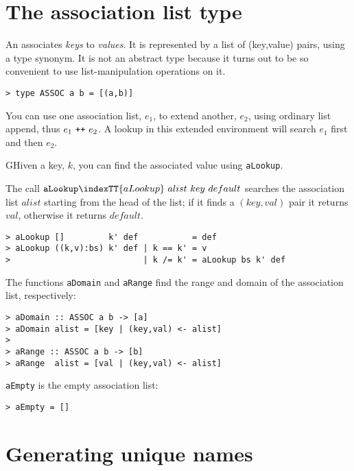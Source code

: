\section{The association list type}
\label{sect:assoc}

An  associates {\em keys\/} to {\em values}.
It is represented by a list of (key,value) pairs, using a type synonym.
It is not an abstract type
because it turns out to be so convenient to use list-manipulation
operations on it.
\begin{verbatim}
> type ASSOC a b = [(a,b)]
\end{verbatim}
%
You can use one association list, $e_1$, to extend another, $e_2$,
using ordinary list append, thus $e_1\ \mbox{\tt ++}\ e_2$.
A lookup in this extended environment
will search $e_1$ first and then $e_2$.

GHiven a key, $k$, you can find the associated value using \mbox{\tt aLookup}.


The call $\mbox{\tt aLookup}\indexTT{aLookup}~alist~key~default$ searches the association list
$alist$ starting from the head of the list;
if it finds a $(key,val)$ pair it returns $val$,
otherwise it returns $default$.
\begin{verbatim}
> aLookup []         k' def           = def
> aLookup ((k,v):bs) k' def | k == k' = v
>                           | k /= k' = aLookup bs k' def
\end{verbatim}
%
%
\par
The functions \mbox{\tt aDomain} and \mbox{\tt aRange} find the range and domain of the
association list, respectively:
\begin{verbatim}
> aDomain :: ASSOC a b -> [a]
> aDomain alist = [key | (key,val) <- alist]
>
> aRange :: ASSOC a b -> [b]
> aRange  alist = [val | (key,val) <- alist]
\end{verbatim}
%
%
%
%
\mbox{\tt aEmpty} is the empty association list:
\begin{verbatim}
> aEmpty = []
\end{verbatim}
%

\section{Generating unique names}

